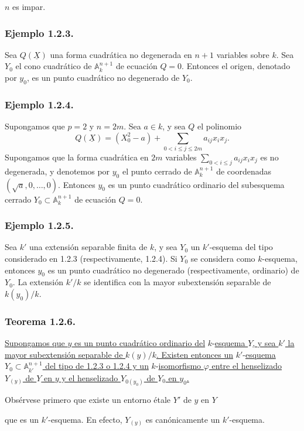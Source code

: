 \pageoriginale

$n$ es impar.

\subsubsection*{Ejemplo 1.2.3.}
Sea $Q(\underline X)$ una forma cuadrática no degenerada en $n+1$
variables sobre $k$. Sea $Y_0$ el cono cuadrático de
$\mathbb A_k^{n+1}$ de ecuación $Q=0$. Entonces el origen, denotado por
$y_0$, es un punto cuadrático no degenerado de $Y_0$.

\subsubsection*{Ejemplo 1.2.4.}
Supongamos que $p=2$ y $n=2m$. Sea $a\in k$, y sea $Q$ el polinomio
\[
Q(\underline X)=(X_0^2-a)
 +\sum_{0<i\leq j\leq2m}a_{ij}x_ix_j.
\]
Supongamos que la forma cuadrática en $2m$ variables
$\sum_{0<i\leq j}a_{ij}x_ix_j$ es no degenerada, y denotemos por $y_0$
el punto cerrado de $\mathbb A_k^{n+1}$ de coordenadas
$(\sqrt a,0,\ldots,0)$. Entonces $y_0$ es un punto cuadrático ordinario
del subesquema cerrado $Y_0\subset\mathbb A_k^{n+1}$ de ecuación $Q=0$.

\subsubsection*{Ejemplo 1.2.5.}
Sea $k'$ una extensión separable finita de $k$, y sea $Y_0$ un
$k'$-esquema del tipo considerado en 1.2.3 (respectivamente, 1.2.4). Si
$Y_0$ se considera como $k$-esquema, entonces $y_0$ es un punto
cuadrático no degenerado (respectivamente, ordinario) de $Y_0$. La
extensión $k'/k$ se identifica con la mayor subextensión separable de
$k(y_0)/k$.

\subsubsection*{Teorema 1.2.6.}
\underline{Supongamos que $y$ es un punto cuadrático ordinario del}
$k$-\underline{esquema $Y$, y sea $k'$ la mayor subextensión separable de
$k(y)/k$. Existen entonces un} $k'$-\underline{esquema
$Y_0\subset\mathbb A_{k'}^{n+1}$ del tipo de 1.2.3 o 1.2.4 y un}
$k$-\underline{isomorfismo $\varphi$ entre el henselizado $Y_{(y)}$ de $Y$ en $y$
y el henselizado $Y_{0(y_0)}$ de $Y_0$ en $y_0$.}

Obsérvese primero que existe un entorno étale $Y'$ de $y$ en $Y$
\begin{center}
\end{center}
que es un $k'$-esquema. En efecto, $Y_{(y)}$ es canónicamente un
$k'$-esquema.

